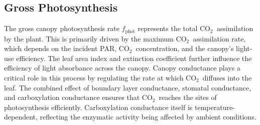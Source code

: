 \documentclass[conference]{IEEEtran}
\newcommand{\ui}[2]{#1_{\mathrm{#2}}}
\newcommand{\coo}{\ensuremath{\mathrm{CO_2}}}
\begin{document}
\subsection{Gross Photosynthesis} The gross canopy photosynthesis rate \( \ui{f}{phot} \) represents the total \coo\ assimilation by the plant. This is primarily driven by the maximum \coo\ assimilation rate, which depends on the incident PAR, \coo\ concentration, and the canopy's light-use efficiency. The leaf area index and extinction coefficient further influence the efficiency of light absorbance across the canopy. Canopy conductance plays a critical role in this process by regulating the rate at which \coo\ diffuses into the leaf. The combined effect of boundary layer conductance, stomatal conductance, and carboxylation conductance ensures that \coo\ reaches the sites of photosynthesis efficiently. Carboxylation conductance itself is temperature-dependent, reflecting the enzymatic activity being affected by ambient conditions.








\end{document}
